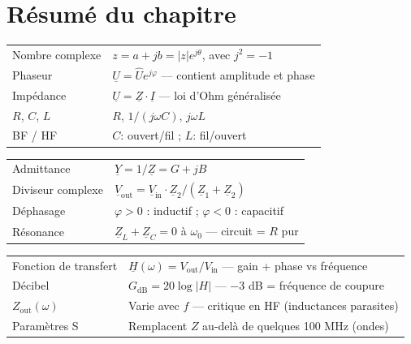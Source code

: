 \documentclass[12pt,a4paper,twoside]{book}
\begin{document}
\section*{Résumé du chapitre}

\begin{bases}[title={\color{white} Résumé --- Les Bases}]
\begin{center}
\renewcommand{\arraystretch}{1.3}
\begin{tabular}{p{4cm}p{9cm}}
\toprule
Nombre complexe & $z = a + jb = |z|e^{j\theta}$, avec $j^2 = -1$ \\
Phaseur & $\underline{U} = \hat{U}e^{j\varphi}$ --- contient amplitude et phase \\
Impédance & $\underline{U} = \underline{Z}\cdot\underline{I}$ --- loi d'Ohm généralisée \\
$R$, $C$, $L$ & $R$, $1/(j\omega C)$, $j\omega L$ \\
BF / HF & $C$: ouvert/fil ; $L$: fil/ouvert \\
\bottomrule
\end{tabular}
\end{center}
\end{bases}

\begin{approfondissement}[title={\color{white} Résumé --- Approfondissement}]
\begin{center}
\renewcommand{\arraystretch}{1.3}
\begin{tabular}{p{4cm}p{9cm}}
\toprule
Admittance & $\underline{Y} = 1/\underline{Z} = G + jB$ \\
Diviseur complexe & $\underline{V}_{\text{out}} = \underline{V}_{\text{in}} \cdot \underline{Z}_2/(\underline{Z}_1+\underline{Z}_2)$ \\
Déphasage & $\varphi > 0$ : inductif ; $\varphi < 0$ : capacitif \\
Résonance & $\underline{Z}_L + \underline{Z}_C = 0$ à $\omega_0$ --- circuit = $R$ pur \\
\bottomrule
\end{tabular}
\end{center}
\end{approfondissement}

\begin{ingenieur}[title={\color{white} Résumé --- Niveau Ingénieur}]
\begin{center}
\renewcommand{\arraystretch}{1.3}
\begin{tabular}{p{4cm}p{9cm}}
\toprule
Fonction de transfert & $\underline{H}(\omega) = V_{\text{out}}/V_{\text{in}}$ --- gain + phase vs fréquence \\
Décibel & $G_{\text{dB}} = 20\log|H|$ --- $-3$ dB = fréquence de coupure \\
$Z_{\text{out}}(\omega)$ & Varie avec $f$ --- critique en HF (inductances parasites) \\
Paramètres S & Remplacent $Z$ au-delà de quelques 100 MHz (ondes) \\
\bottomrule
\end{tabular}
\end{center}
\end{ingenieur}
\end{document}
